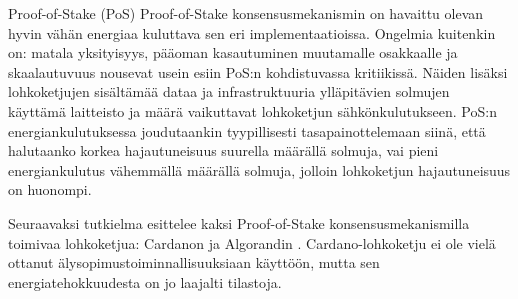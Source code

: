 \begin{section}{Proof-of-Stake (PoS)\label{pos}}
Proof-of-Stake konsensusmekanismin on havaittu olevan hyvin vähän energiaa kuluttava sen eri implementaatioissa. Ongelmia kuitenkin on: matala yksityisyys, pääoman kasautuminen muutamalle osakkaalle ja skaalautuvuus nousevat usein esiin PoS:n kohdistuvassa kritiikissä. Näiden lisäksi lohkoketjujen sisältämää dataa ja infrastruktuuria ylläpitävien solmujen käyttämä laitteisto ja määrä vaikuttavat lohkoketjun sähkönkulutukseen. PoS:n energiankulutuksessa joudutaankin tyypillisesti tasapainottelemaan siinä, että halutaanko korkea hajautuneisuus suurella määrällä solmuja, vai pieni energiankulutus vähemmällä määrällä solmuja, jolloin lohkoketjun hajautuneisuus on huonompi.

Seuraavaksi tutkielma esittelee kaksi Proof-of-Stake konsensusmekanismilla toimivaa lohkoketjua: Cardanon \cite{cardanowhitepaper} ja Algorandin \cite{algorandwhitepaper}. Cardano-lohkoketju ei ole vielä ottanut älysopimustoiminnallisuuksiaan käyttöön, mutta sen energiatehokkuudesta on jo laajalti tilastoja.



\end{section}